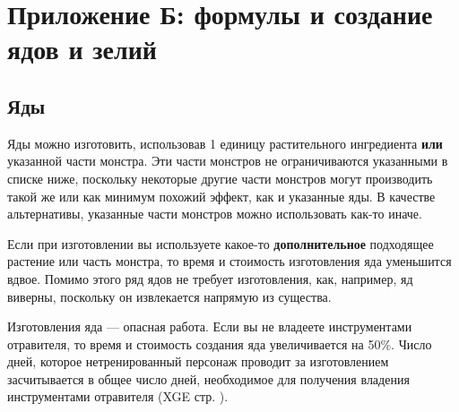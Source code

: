 \documentclass[a4paper, 9pt, twocolumn]{book}
\begin{document}
	\chapter{Приложение Б: формулы и создание ядов и зелий}
	
	\section{Яды}
	
	Яды можно изготовить, использовав 1 единицу растительного ингредиента \textbf{или} указанной части монстра. Эти части монстров не ограничиваются указанными в списке ниже, поскольку некоторые другие части монстров могут производить такой же или как минимум похожий эффект, как и указанные яды. В качестве альтернативы, указанные части монстров можно использовать как-то иначе.
	
	Если при изготовлении вы используете какое-то \textbf{дополнительное} подходящее растение или часть монстра, то время и стоимость  изготовления яда уменьшится вдвое. Помимо этого ряд ядов не требует изготовления, как, например, яд виверны, поскольку он извлекается напрямую из существа.
	
	Изготовления яда --- опасная работа. Если вы не владеете инструментами отравителя, то время и стоимость создания яда увеличивается на 50\%. Число дней, которое нетренированный персонаж проводит за изготовлением засчитывается в общее число дней, необходимое для получения владения инструментами отравителя (XGE стр. ). %
	
\end{document}
